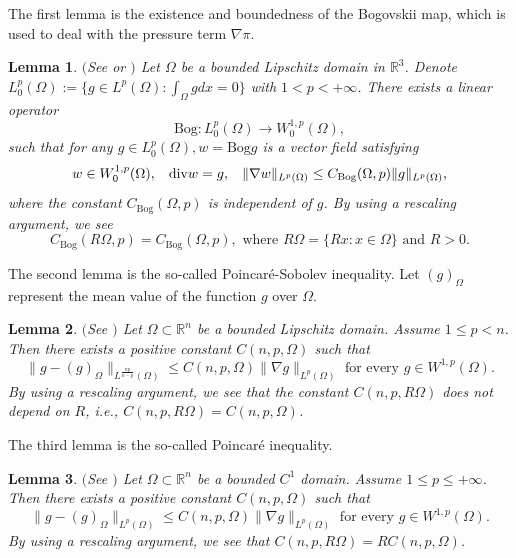 \documentclass[11pt,reqno]{amsart}
\newtheorem{Lem}{Lemma}[section]
\numberwithin{Thm}{section}
\begin{document}
The first lemma is the existence and boundedness of the Bogovskii map, which is used to deal with the pressure term $\nabla \pi$.
\begin{Lem}\label{Lem2.1}$($See {\rm \cite[Lemma 1]{Tsai21}} or {\rm\cite[Theorem III.3.3]{Galdi}}$)$
Let $\Omega$ be a bounded Lipschitz domain in $\mathbb{R}^{3}$. Denote $L_{0}^p(\Omega):=\{g\in L^p(\Omega):\int_\Omega gdx=0\}$ with $1<p<+\infty$. There exists a linear operator
\begin{equation*}
\mathrm{Bog}:L_{0}^p(\Omega)\rightarrow W_{0}^{1,p}(\Omega),
\end{equation*}
such that for any  $g\in L_{0}^p(\Omega),w=\mathrm{Bog}g$ is a vector field satisfying
\begin{equation*}
w\in W_{0}^{1,p}(\Omega), \hspace{0.3cm}\mathrm{div}w=g,\hspace{0.3cm}\|\nabla w\|_{L^p(\Omega)}\leq C_{\mathrm{Bog}}(\Omega,p)\|g\|_{L^p(\Omega)},
\end{equation*}
where the constant $C_{\mathrm{Bog}}(\Omega,p)$  is independent of $g$. By using a rescaling argument, we see
$$C_{\mathrm{Bog}}(R\Omega,p)=C_{\mathrm{Bog}}(\Omega,p),\text{ where $R\Omega=\{Rx:x\in \Omega\}$ and $R>0$.}$$
\end{Lem}



The second lemma is the so-called Poincar\'{e}-Sobolev inequality. Let $(g)_{\Omega}$ represent the mean value of the function $g$ over $\Omega$.
\begin{Lem}\label{Lem2.2}$($See {\rm\cite[Theorem 3.15]{Giusti}}$)$
Let $\Omega\subset\mathbb{R}^n$ be a bounded Lipschitz domain. Assume $1\leq p<n$. Then there exists a positive constant $C(n,p,\Omega)$ such that
$$\|g-(g)_{\Omega}\|_{L^{\frac{np}{n-p}}(\Omega)}\leq C(n,p,\Omega)\|\nabla g\|_{L^{p}(\Omega)}\text{ for every $g\in W^{1,p}(\Omega)$.}$$
By using a rescaling argument, we see that the constant $C(n,p,R\Omega)$ does not depend on $R$, i.e.,  $C(n,p,R\Omega)=C(n,p,\Omega)$.
\end{Lem}

The third lemma is the so-called Poincar\'{e} inequality.
\begin{Lem}\label{Lem2.3}$($See {\rm\cite[p.292, Theorem 1]{Evans}}$)$
Let $\Omega\subset\mathbb{R}^n$ be a bounded $C^1$ domain. Assume $1\leq p\leq +\infty$. Then there exists a positive constant $C(n,p,\Omega)$ such that
$$\|g-(g)_{\Omega}\|_{L^p(\Omega)}\leq C(n,p,\Omega)\|\nabla g\|_{L^{p}(\Omega)}\text{ for every $g\in W^{1,p}(\Omega)$.}$$
By using a rescaling argument, we see that $C(n,p,R\Omega)=RC(n,p,\Omega)$.
\end{Lem}
\end{document}
